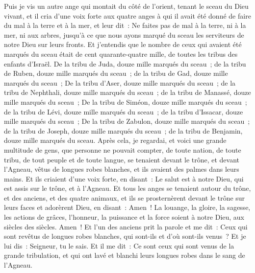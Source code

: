 \begin{multicols}{2}
Puis je vis un autre ange qui montait du côté de l'orient, tenant le sceau du Dieu vivant, et il cria d'une voix forte aux quatre anges à qui il avait été donné de faire du mal à la terre et à la mer,
et leur dit~: Ne faites pas de mal à la terre, ni à la mer, ni aux arbres, jusqu'à ce que nous ayons marqué du sceau les serviteurs de notre Dieu sur leurs fronts.
Et j'entendis que le nombre de ceux qui avaient été marqués du sceau était de cent quarante-quatre mille, de toutes les tribus des enfants d'Israël.
De la tribu de Juda, douze mille marqués du sceau~; de la tribu de Ruben, douze mille marqués du sceau~; de la tribu de Gad, douze mille marqués du sceau~;
De la tribu d'Aser, douze mille marqués du sceau~; de la tribu de Nephthali, douze mille marqués du sceau~; de la tribu de Manassé, douze mille marqués du sceau~;
De la tribu de Siméon, douze mille marqués du sceau~; de la tribu de Lévi, douze mille marqués du sceau~; de la tribu d'Issacar, douze mille marqués du sceau~;
De la tribu de Zabulon, douze mille marqués du sceau~; de la tribu de Joseph, douze mille marqués du sceau~; de la tribu de Benjamin, douze mille marqués du sceau.
Après cela, je regardai, et voici une grande multitude de gens, que personne ne pouvait compter, de toute nation, de toute tribu, de tout peuple et de toute langue, se tenaient devant le trône, et devant l'Agneau, vêtus de longues robes blanches, et ils avaient des palmes dans leurs mains.
Et ils criaient d'une voix forte, en disant~: Le salut est à notre Dieu, qui est assis sur le trône, et à l'Agneau.
Et tous les anges se tenaient autour du trône, et des anciens, et des quatre animaux, et ils se prosternèrent devant le trône sur leurs faces et adorèrent Dieu,
en disant~: Amen~! La louange, la gloire, la sagesse, les actions de grâces, l'honneur, la puissance et la force soient à notre Dieu, aux siècles des siècles. Amen~!
Et l'un des anciens prit la parole et me dit~: Ceux qui sont revêtus de longues robes blanches, qui sont-ils et d'où sont-ils venus~?
Et je lui dis~: Seigneur, tu le sais. Et il me dit~: Ce sont ceux qui sont venus de la grande tribulation, et qui ont lavé et blanchi leurs longues robes dans le sang de l'Agneau.

\end{multicols}
